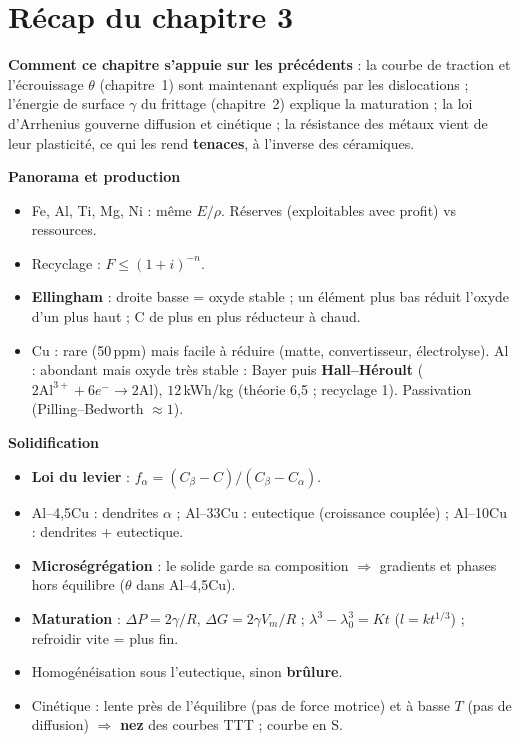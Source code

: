 \section*{Récap du chapitre 3}

\begin{recapbox}
\textbf{Comment ce chapitre s'appuie sur les précédents} : la courbe de traction et
l'écrouissage $\theta$ (chapitre~1) sont maintenant expliqués par les dislocations ; l'énergie de
surface $\gamma$ du frittage (chapitre~2) explique la maturation ; la loi d'Arrhenius gouverne
diffusion et cinétique ; la résistance des métaux vient de leur plasticité, ce qui les rend
\textbf{tenaces}, à l'inverse des céramiques.

\textbf{Panorama et production}
\begin{itemize}
  \item Fe, Al, Ti, Mg, Ni : même $E/\rho$. Réserves (exploitables avec profit) vs ressources.
  \item Recyclage : \textbf{$F \le (1+i)^{-n}$}.
  \item \textbf{Ellingham} : droite basse = oxyde stable ; un élément plus bas réduit l'oxyde
        d'un plus haut ; C de plus en plus réducteur à chaud.
  \item Cu : rare (50\,ppm) mais facile à réduire (matte, convertisseur, électrolyse). Al :
        abondant mais oxyde très stable : Bayer puis \textbf{Hall--Héroult}
        ($2\text{Al}^{3+} + 6e^- \to 2\text{Al}$), $12$\,kWh/kg (théorie 6,5 ; recyclage 1).
        Passivation (Pilling--Bedworth $\approx 1$).
\end{itemize}

\textbf{Solidification}
\begin{itemize}
  \item \textbf{Loi du levier} : $f_\alpha = (C_\beta - C)/(C_\beta - C_\alpha)$.
  \item Al--4,5Cu : dendrites $\alpha$ ; Al--33Cu : eutectique (croissance couplée) ;
        Al--10Cu : dendrites + eutectique.
  \item \textbf{Microségrégation} : le solide garde sa composition $\Rightarrow$ gradients et
        phases hors équilibre ($\theta$ dans Al--4,5Cu).
  \item \textbf{Maturation} : $\Delta P = 2\gamma/R$, $\Delta G = 2\gamma V_m/R$ ;
        \textbf{$\lambda^3 - \lambda_0^3 = Kt$} ($l = kt^{1/3}$) ; refroidir vite = plus fin.
  \item Homogénéisation sous l'eutectique, sinon \textbf{brûlure}.
  \item Cinétique : lente près de l'équilibre (pas de force motrice) et à basse $T$ (pas de
        diffusion) $\Rightarrow$ \textbf{nez} des courbes TTT ; courbe en S.
\end{itemize}


\end{recapbox}
